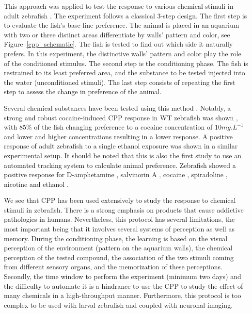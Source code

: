     This approach was applied to test the response to various chemical stimuli in adult zebrafish \cite{mathur2011conditioned}. The experiment follows a classical 3-step design. The first step is to evaluate the fish's base-line preference. The animal is placed in an aquarium with two or three distinct areas differentiate by walls' pattern and color, see Figure~\ref{cpp_schematic}. The fish is tested to find out which side it naturally prefers. In this experiment, the distinctive walls' pattern and color play the role of the conditioned stimulus. The second step is the conditioning phase. The fish is restrained to its least preferred area, and the substance to be tested injected into the water (unconditioned stimuli). The last step consists of repeating the first step to assess the change in preference of the animal.

    Several chemical substances have been tested using this method \cite{blaser2014experiments,collier2013utility,tzschentke2007review}. Notably, a strong and robust cocaine-induced CPP response in WT zebrafish was shown \cite{darland2001behavioral}, with $85\%$ of the fish changing preference to a cocaine concentration of $10mg.L^{-1}$ and lower and higher concentrations resulting in a lower response. A positive response of adult zebrafish to a single ethanol exposure was shown \cite{mathur2011preference} in a similar experimental setup. It should be noted that this is also the first study to use an automated tracking system to calculate animal preference. Zebrafish showed a positive response for D-amphetamine \cite{ninkovic2006genetic, ninkovic2006zebrafish}, salvinorin A \cite{braida2007hallucinatory}, cocaine \cite{braida2007hallucinatory}, spiradoline \cite{braida2007hallucinatory}, nicotine \cite{kedikian2013behavioral} and ethanol \cite{kedikian2013behavioral}.

    We see that CPP has been used extensively to study the response to chemical stimuli in zebrafish. There is a strong emphasis on products that cause addictive pathologies in humans. Nevertheless, this protocol has several limitations, the most important being that it involves several systems of perception as well as memory. During the conditioning phase, the learning is based on the visual perception of the environment (pattern on the aquarium walls), the chemical perception of the tested compound, the association of the two stimuli coming from different sensory organs, and the memorization of these perceptions. Secondly, the time window to perform the experiment (minimum two days) and the difficulty to automate it is a hindrance to use the CPP to study the effect of many chemicals in a high-throughput manner. Furthermore, this protocol is too complex to be used with larval zebrafish and coupled with neuronal imaging.

